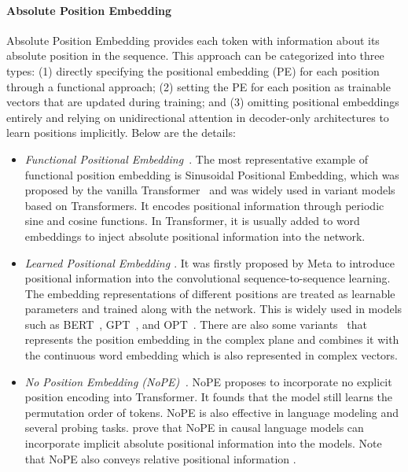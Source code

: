 \documentclass[11pt, a4paper, logo, copyright, nonumbering]{map}
\begin{document}
\paragraph{Absolute Position Embedding} Absolute Position Embedding provides each token with information about its absolute position in the sequence. This approach can be categorized into three types: (1) directly specifying the positional embedding (PE) for each position through a functional approach; (2) setting the PE for each position as trainable vectors that are updated during training; and (3) omitting positional embeddings entirely and relying on unidirectional attention in decoder-only architectures to learn positions implicitly. Below are the details:
\begin{itemize}
\item \textit{Functional Positional Embedding~\citep{vaswani2017attention}}. The most representative example of functional position embedding is Sinusoidal Positional Embedding, which was proposed by the vanilla Transformer~\citep{vaswani2017attention} and was widely used in variant models based on Transformers. It encodes positional information through periodic sine and cosine functions. In Transformer, it is usually added to word embeddings to inject absolute positional information into the network. 
\item \textit{Learned Positional Embedding \cite{gehring2017convolutional}}. It was firstly proposed by Meta to introduce positional information into the convolutional sequence-to-sequence learning. The embedding representations of different positions are treated as learnable parameters and trained along with the network. This is widely used in models such as BERT~\citep{devlin-etal-2019-bert}, GPT~\citep{10.5555/3495724.3495883}, and OPT~\citep{zhang2022opt_model_pretrained}. There are also some variants~\cite{wang2019encoding} that represents the position embedding in the complex plane and combines it with the continuous word embedding which is also represented in complex vectors.

\item \textit{No Position Embedding (NoPE)~\cite{chi2023latent,kazemnejad2024impact}.} NoPE proposes to incorporate no explicit position encoding into Transformer. It founds that the model still learns the permutation order of tokens. NoPE is also effective in language modeling and several probing tasks. \citep{chi2023latent} prove that NoPE in causal language models can incorporate implicit absolute positional information into the models. Note that NoPE also conveys relative positional information \cite{kazemnejad2024impact}. 
\end{itemize}
\end{document}
